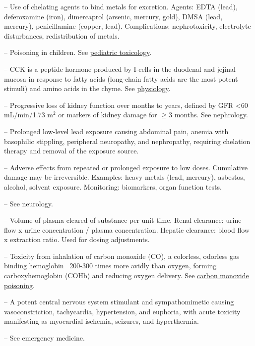 -- Use of chelating agents to bind metals for excretion. Agents: EDTA (lead), deferoxamine (iron), dimercaprol (arsenic, mercury, gold), DMSA (lead, mercury), penicillamine (copper, lead). Complications: nephrotoxicity, electrolyte disturbances, redistribution of metals.

-- Poisoning in children. See \hyperlink{Pediatric Toxicology}{pediatric toxicology}.

-- CCK is a peptide hormone produced by I-cells in the duodenal and jejinal mucosa in response to fatty acids (long-chain fatty acids are the most potent stimuli) and amino acids in the chyme. See \hyperlink{Physiology}{physiology}.

-- Progressive loss of kidney function over months to years, defined by GFR <60 mL/min/1.73 m$^2$ or markers of kidney damage for \(\ge\)3 months. See nephrology.

-- Prolonged low-level lead exposure causing abdominal pain, anemia with basophilic stippling, peripheral neuropathy, and nephropathy, requiring chelation therapy and removal of the exposure source.

-- Adverse effects from repeated or prolonged exposure to low doses. Cumulative damage may be irreversible. Examples: heavy metals (lead, mercury), asbestos, alcohol, solvent exposure. Monitoring: biomarkers, organ function tests.

-- See neurology.

-- Volume of plasma cleared of substance per unit time. Renal clearance: urine flow x urine concentration / plasma concentration. Hepatic clearance: blood flow x extraction ratio. Used for dosing adjustments.

-- Toxicity from inhalation of carbon monoxide (CO), a colorless, odorless gas binding hemoglobin ~200-300 times more avidly than oxygen, forming carboxyhemoglobin (COHb) and reducing oxygen delivery. See \hyperlink{Carbon Monoxide Poisoning}{carbon monoxide poisoning}.

-- A potent central nervous system stimulant and sympathomimetic causing vasoconstriction, tachycardia, hypertension, and euphoria, with acute toxicity manifesting as myocardial ischemia, seizures, and hyperthermia.

-- See emergency medicine.

